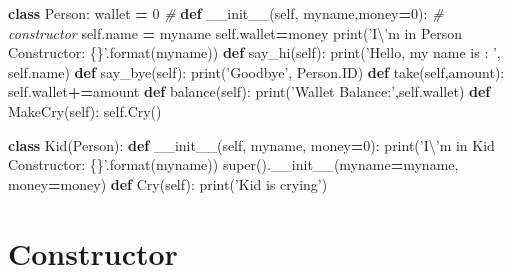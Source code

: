 \documentclass[
]{book}
\newenvironment{Shaded}{\begin{snugshade}}{\end{snugshade}}
\newcommand{\BuiltInTok}[1]{#1}
\newcommand{\CharTok}[1]{\textcolor[rgb]{0.5,0.5,0.5}{#1}}
\newcommand{\CommentTok}[1]{\textcolor[rgb]{0.37,0.37,0.37}{\textit{#1}}}
\newcommand{\DecValTok}[1]{\textcolor[rgb]{0.06,0.06,0.06}{#1}}
\newcommand{\FunctionTok}[1]{\textcolor[rgb]{0,0,0}{#1}}
\newcommand{\KeywordTok}[1]{\textcolor[rgb]{0.27,0.27,0.27}{\textbf{#1}}}
\newcommand{\NormalTok}[1]{#1}
\newcommand{\OperatorTok}[1]{\textcolor[rgb]{0.43,0.43,0.43}{\textbf{#1}}}
\newcommand{\SpecialCharTok}[1]{\textcolor[rgb]{0,0,0}{#1}}
\newcommand{\StringTok}[1]{\textcolor[rgb]{0.5,0.5,0.5}{#1}}
\newcommand{\VariableTok}[1]{\textcolor[rgb]{0,0,0}{#1}}
\begin{document}
\begin{Shaded}
\begin{Highlighting}[]
\KeywordTok{class}\NormalTok{ Person:}
\NormalTok{  wallet }\OperatorTok{=} \DecValTok{0}  \CommentTok{# }
  \KeywordTok{def} \FunctionTok{__init__}\NormalTok{(}\VariableTok{self}\NormalTok{, myname,money}\OperatorTok{=}\DecValTok{0}\NormalTok{):   }\CommentTok{# constructor}
      \VariableTok{self}\NormalTok{.name }\OperatorTok{=}\NormalTok{ myname}
      \VariableTok{self}\NormalTok{.wallet}\OperatorTok{=}\NormalTok{money}
      \BuiltInTok{print}\NormalTok{(}\StringTok{'I}\CharTok{\textbackslash{}'}\StringTok{m in Person Constructor: }\SpecialCharTok{\{\}}\StringTok{'}\NormalTok{.}\BuiltInTok{format}\NormalTok{(myname))}
  \KeywordTok{def}\NormalTok{ say_hi(}\VariableTok{self}\NormalTok{):}
      \BuiltInTok{print}\NormalTok{(}\StringTok{'Hello, my name is : '}\NormalTok{, }\VariableTok{self}\NormalTok{.name)}
  \KeywordTok{def}\NormalTok{ say_bye(}\VariableTok{self}\NormalTok{):}
      \BuiltInTok{print}\NormalTok{(}\StringTok{'Goodbye'}\NormalTok{, Person.ID)}
  \KeywordTok{def}\NormalTok{ take(}\VariableTok{self}\NormalTok{,amount):}
      \VariableTok{self}\NormalTok{.wallet}\OperatorTok{+=}\NormalTok{amount}
  \KeywordTok{def}\NormalTok{ balance(}\VariableTok{self}\NormalTok{):}
      \BuiltInTok{print}\NormalTok{(}\StringTok{'Wallet Balance:'}\NormalTok{,}\VariableTok{self}\NormalTok{.wallet)}
  \KeywordTok{def}\NormalTok{ MakeCry(}\VariableTok{self}\NormalTok{):}
      \VariableTok{self}\NormalTok{.Cry()}
      
\KeywordTok{class}\NormalTok{ Kid(Person):}
  \KeywordTok{def} \FunctionTok{__init__}\NormalTok{(}\VariableTok{self}\NormalTok{, myname, money}\OperatorTok{=}\DecValTok{0}\NormalTok{):}
      \BuiltInTok{print}\NormalTok{(}\StringTok{'I}\CharTok{\textbackslash{}'}\StringTok{m in Kid Constructor: }\SpecialCharTok{\{\}}\StringTok{'}\NormalTok{.}\BuiltInTok{format}\NormalTok{(myname))}
      \BuiltInTok{super}\NormalTok{().}\FunctionTok{__init__}\NormalTok{(myname}\OperatorTok{=}\NormalTok{myname, money}\OperatorTok{=}\NormalTok{money)}
  \KeywordTok{def}\NormalTok{ Cry(}\VariableTok{self}\NormalTok{):}
      \BuiltInTok{print}\NormalTok{(}\StringTok{'Kid is crying'}\NormalTok{)}
\end{Highlighting}
\end{Shaded}

\hypertarget{constructor-2}{%
\section{Constructor}\label{constructor-2}}
\end{document}
